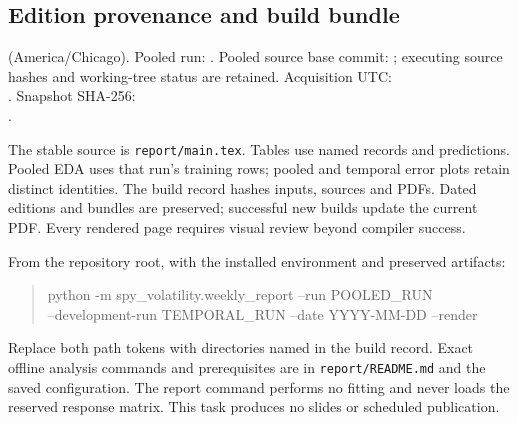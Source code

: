 \documentclass[10pt,letterpaper]{article}
\newcommand{\code}[1]{\texttt{\small #1}}\newcommand{\sd}{\operatorname{sd}}
\begin{document}
\subsection{Edition provenance and build bundle}
\ReportDate{} (America/Chicago). Pooled run: \texttt{\RunID}.
Pooled source base commit: \texttt{\SourceCommit}; executing source hashes and
working-tree status are retained. Acquisition UTC:\\
\texttt{\SnapshotTime}.
Snapshot SHA-256:\\{\scriptsize\texttt{\SnapshotHash}}.

The stable source is \code{report/main.tex}. Tables use named records and
predictions. Pooled EDA uses that run's training rows; pooled and temporal error
plots retain distinct identities. The build record hashes inputs, sources and
PDFs. Dated editions and bundles are preserved; successful new builds update the
current PDF. Every rendered page requires visual review beyond compiler success.

From the repository root, with the installed environment and preserved artifacts:
\begin{quote}\small\ttfamily
python -m spy\_volatility.weekly\_report --run POOLED\_RUN\\
\hspace*{1em}--development-run TEMPORAL\_RUN --date YYYY-MM-DD --render
\end{quote}
Replace both path tokens with directories named in the build record. Exact
offline analysis commands and prerequisites are in \code{report/README.md} and
the saved configuration. The report command performs no fitting and never loads
the reserved response matrix. This task produces no slides or scheduled publication.
\end{document}
